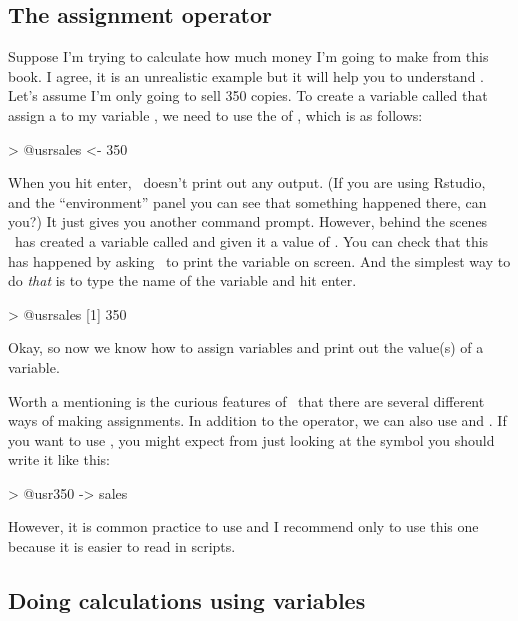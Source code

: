 \subsection{The assignment operator \rtext{<-} }

Suppose I'm trying to calculate how much money I'm going to make from this book. I agree, it is an unrealistic example but it will help you to understand \R. 
Let's assume I'm only going to sell 350 copies. To create a variable called  that assign a  to my variable , we need to use the  of \R, which is \rtext{<-} as follows:
\begin{rblock1}
> @usr{sales <- 350}
\end{rblock1}
When you hit enter, \R\ doesn't print out any output. (If you are using Rstudio, and the ``environment'' panel you can see that something happened there, can you?) It just gives you another command prompt. However, behind the scenes \R\ has created a variable called  and given it a value of . You can check that this has happened by asking \R\ to print the variable on screen. And the simplest way to do {\it that} is to type the name of the variable and hit enter.
\begin{rblock1}
> @usr{sales}
[1] 350
\end{rblock1}

Okay, so now we know how to assign variables and print out the value(s) of a variable. 

Worth a mentioning is the curious features of \R\ that there are several different ways of making assignments. In addition to the \rtext{<-} operator, we can also use \rtext{->} and \rtext{=}. If you want to use \rtext{->}, you might expect from just looking at the symbol you should write it like this:
\begin{rblock1}
> @usr{350 -> sales}
\end{rblock1}
However, it is common practice to use \rtext{<-} and I recommend only to use this one because it is easier to read in scripts.


\subsection{Doing calculations using variables}

